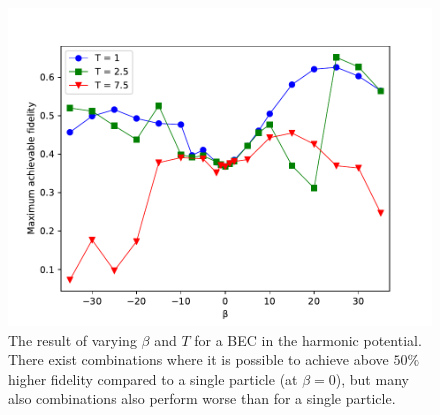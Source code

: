 \documentclass[a4paper, twocolumn]{revtex4-1}
\begin{document}
\begin{figure}[h]
	\includegraphics[width=\columnwidth]{graphics/exploration/betaTHO.pdf}
	\caption{The result of varying $\beta$ and $T$ for a BEC in the harmonic potential. There exist combinations where it is possible to achieve above $50\%$ higher fidelity compared to a single particle (at $\beta=0$), but many also combinations also perform worse than for a single particle.}
	\label{fig:HO}
\end{figure}
\end{document}
